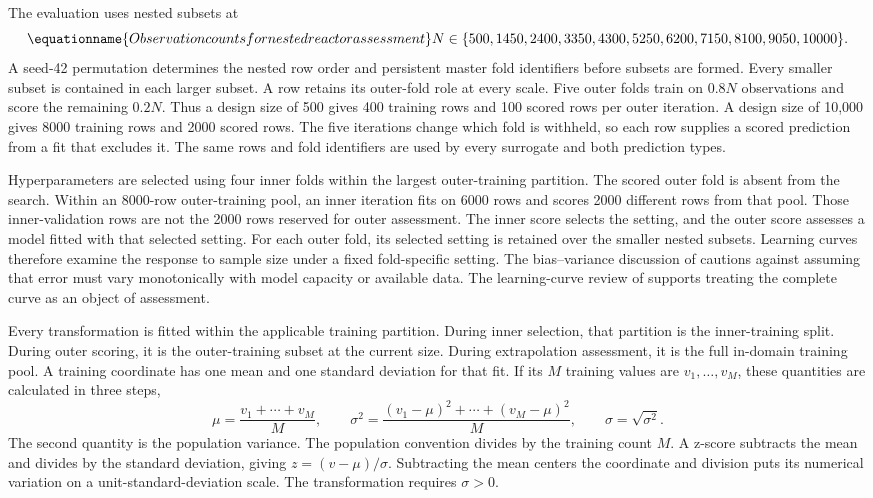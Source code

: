 The evaluation uses nested subsets at
\begin{equation}
\equationname{Observation counts for nested reactor assessment}
N\in\{500,1450,2400,3350,4300,5250,6200,7150,8100,9050,10000\}.
\label{eq:reactor_nested_sample_sizes}
\end{equation}
A seed-42 permutation determines the nested row order and persistent master fold identifiers before subsets are formed. Every smaller subset is contained in each larger subset. A row retains its outer-fold role at every scale. Five outer folds train on $0.8N$ observations and score the remaining $0.2N$. Thus a design size of 500 gives 400 training rows and 100 scored rows per outer iteration. A design size of 10,000 gives 8000 training rows and 2000 scored rows. The five iterations change which fold is withheld, so each row supplies a scored prediction from a fit that excludes it. The same rows and fold identifiers are used by every surrogate and both prediction types.

Hyperparameters are selected using four inner folds within the largest outer-training partition. The scored outer fold is absent from the search. Within an 8000-row outer-training pool, an inner iteration fits on 6000 rows and scores 2000 different rows from that pool. Those inner-validation rows are not the 2000 rows reserved for outer assessment. The inner score selects the setting, and the outer score assesses a model fitted with that selected setting. For each outer fold, its selected setting is retained over the smaller nested subsets. Learning curves therefore examine the response to sample size under a fixed fold-specific setting. The bias--variance discussion of \citet{Belkin2019} cautions against assuming that error must vary monotonically with model capacity or available data. The learning-curve review of \citet{VieringLoog2023} supports treating the complete curve as an object of assessment.

Every transformation is fitted within the applicable training partition. During inner selection, that partition is the inner-training split. During outer scoring, it is the outer-training subset at the current size. During extrapolation assessment, it is the full in-domain training pool. A training coordinate has one mean and one standard deviation for that fit. If its $M$ training values are $v_1,\ldots,v_M$, these quantities are calculated in three steps,
\[
\mu=\frac{v_1+\cdots+v_M}{M},\qquad
\sigma^2=\frac{(v_1-\mu)^2+\cdots+(v_M-\mu)^2}{M},\qquad
\sigma=\sqrt{\sigma^2}.
\]
The second quantity is the population variance. The population convention divides by the training count $M$. A z-score subtracts the mean and divides by the standard deviation, giving $z=(v-\mu)/\sigma$. Subtracting the mean centers the coordinate and division puts its numerical variation on a unit-standard-deviation scale. The transformation requires $\sigma>0$.

